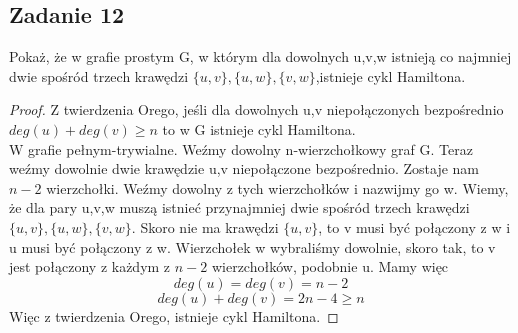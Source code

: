\documentclass[a4paper]{article}
\begin{document}
\begin{itemize}
\subsection*{Zadanie 12}
Pokaż, że w grafie prostym G, w którym dla dowolnych u,v,w istnieją co najmniej dwie spośród trzech krawędzi $\lbrace u,v \rbrace , \lbrace u,w \rbrace , \lbrace v,w \rbrace $,istnieje cykl Hamiltona.
\begin{proof}
Z twierdzenia Orego, jeśli dla dowolnych u,v niepołączonych bezpośrednio $deg(u)+deg(v)\geq n$ to w G istnieje cykl Hamiltona.\\
W grafie pełnym-trywialne.
Weźmy dowolny n-wierzchołkowy graf G. Teraz weźmy dowolnie dwie krawędzie u,v niepołączone bezpośrednio. Zostaje nam $n-2$ wierzchołki. Weźmy dowolny z tych wierzchołków i nazwijmy go w. Wiemy, że dla pary u,v,w muszą istnieć przynajmniej dwie spośród trzech krawędzi $\lbrace u,v \rbrace , \lbrace u,w \rbrace , \lbrace v,w \rbrace $. Skoro nie ma krawędzi $\lbrace u,v \rbrace$, to v musi być połączony z w i u musi być połączony z w. Wierzchołek w wybraliśmy dowolnie, skoro tak, to v jest połączony z każdym z $n-2$ wierzchołków, podobnie u. Mamy więc $$ deg(u)=deg(v)=n-2 $$ $$deg(u)+deg(v)=2n-4\geq n $$ Więc z twierdzenia Orego, istnieje cykl Hamiltona.

\end{proof}

\end{itemize}
\end{document}

